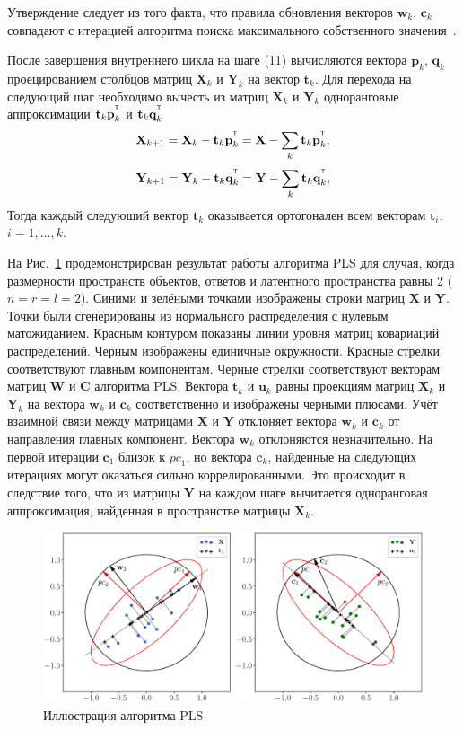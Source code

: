 \documentclass[12pt,twoside]{article}
\newcommand{\bw}{\mathbf{w}}
\newcommand{\bY}{\mathbf{Y}}
\newcommand{\bX}{\mathbf{X}}
\newcommand{\bu}{\mathbf{u}}
\newcommand{\bt}{\mathbf{t}}
\newcommand{\bp}{\mathbf{p}}
\newcommand{\bq}{\mathbf{q}}
\newcommand{\bc}{\mathbf{c}}
\newcommand{\bC}{\mathbf{C}}
\newcommand{\bW}{\mathbf{W}}
\newcommand{\T}{^{\text{\tiny\sffamily\upshape\mdseries T}}}
\begin{document}
Утверждение следует из того факта, что правила обновления векторов $\bw_k$, $\bc_k$ совпадают с итерацией алгоритма поиска максимального собственного значения~\cite{mises1929praktische}.

После завершения внутреннего цикла на шаге (11) вычисляются вектора $\bp_k$, $\bq_k$ проецированием столбцов матриц $\bX_k$ и $\bY_k$ на вектор $\bt_k$. Для перехода на следующий шаг необходимо вычесть из матриц $\bX_k$ и $\bY_k$ одноранговые аппроксимации $\bt_k \bp_k^{\T}$ и $\bt_k \bq_k^{\T}$
\begin{equation*}
    \bX_{k + 1} = \bX_{k} - \bt_k \bp_k^{\T} = \bX - \sum_k \bt_k \bp_k^{\T},
\end{equation*}
\begin{equation*}
    \bY_{k + 1} = \bY_{k} - \bt_k \bq_k^{\T} = \bY - \sum_k \bt_k \bq_k^{\T},
\end{equation*}
Тогда каждый следующий вектор $\bt_k$ оказывается ортогонален всем векторам $\bt_i$, $i=1, \dots, k$.

На Рис.~\ref{fig::PLSFigure} продемонстрирован результат работы алгоритма PLS для случая, когда размерности пространств объектов, ответов и латентного пространства равны 2 ($n = r = l = 2$).
Синими и зелёными точками изображены строки матриц $\bX$ и $\bY$. 
Точки были сгенерированы из нормального распределения с нулевым матожиданием. 
Красным контуром показаны линии уровня матриц ковариаций распределений. 
Черным изображены единичные окружности. 
Красные стрелки соответствуют главным компонентам. 
Черные стрелки соответствуют векторам матриц $\bW$ и $\bC$ алгоритма PLS. 
Вектора $\bt_k$ и $\bu_k$ равны проекциям матриц $\bX_k$ и $\bY_k$ на вектора $\bw_k$ и $\bc_k$ соответственно и изображены черными плюсами. 
Учёт взаимной связи между матрицами $\bX$ и $\bY$ отклоняет вектора $\bw_k$ и $\bc_k$ от направления главных компонент. 
Вектора $\bw_k$ отклоняются незначительно. 
На первой итерации $\bc_1$ близок к $\textit{pc}_1$, но вектора $\bc_k$, найденные на следующих итерациях могут оказаться сильно коррелированными. Это происходит в следствие того, что из матрицы $\bY$ на каждом шаге вычитается одноранговая аппроксимация, найденная в пространстве матрицы $\bX_k$.
\begin{figure}[h]
	\centering
	\includegraphics[width=\linewidth]{figs/PLSFigure.eps}
	\caption{Иллюстрация алгоритма PLS}
	\label{fig::PLSFigure}
\end{figure}
\end{document}
